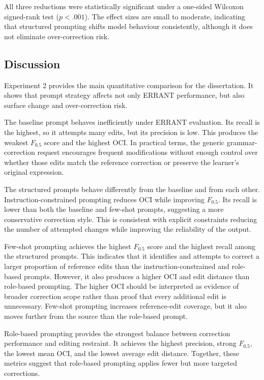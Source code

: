 All three reductions were statistically significant under a one-sided Wilcoxon signed-rank test ($p < .001$). The effect sizes are small to moderate, indicating that structured prompting shifts model behaviour consistently, although it does not eliminate over-correction risk.

\subsection{Discussion}

Experiment 2 provides the main quantitative comparison for the dissertation. It shows that prompt strategy affects not only ERRANT performance, but also surface change and over-correction risk.

The baseline prompt behaves inefficiently under ERRANT evaluation. Its recall is the highest, so it attempts many edits, but its precision is low. This produces the weakest $F_{0.5}$ score and the highest OCI. In practical terms, the generic grammar-correction request encourages frequent modifications without enough control over whether those edits match the reference correction or preserve the learner's original expression.

The structured prompts behave differently from the baseline and from each other. Instruction-constrained prompting reduces OCI while improving $F_{0.5}$. Its recall is lower than both the baseline and few-shot prompts, suggesting a more conservative correction style. This is consistent with explicit constraints reducing the number of attempted changes while improving the reliability of the output.

Few-shot prompting achieves the highest $F_{0.5}$ score and the highest recall among the structured prompts. This indicates that it identifies and attempts to correct a larger proportion of reference edits than the instruction-constrained and role-based prompts. However, it also produces a higher OCI and edit distance than role-based prompting. The higher OCI should be interpreted as evidence of broader correction scope rather than proof that every additional edit is unnecessary. Few-shot prompting increases reference-edit coverage, but it also moves further from the source than the role-based prompt.

Role-based prompting provides the strongest balance between correction performance and editing restraint. It achieves the highest precision, strong $F_{0.5}$, the lowest mean OCI, and the lowest average edit distance. Together, these metrics suggest that role-based prompting applies fewer but more targeted corrections.


